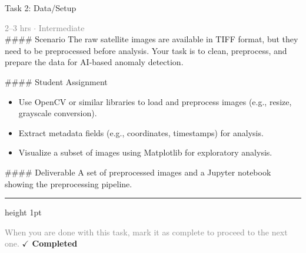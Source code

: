 \documentclass[10pt,a4paper]{article}
\begin{document}
\begin{taskbox}{Task 2: Data/Setup}

    {\small \textcolor{gray}{2--3 hrs $\cdot$ Intermediate}}\\[12pt]

    \#\#\#\# Scenario  
The raw satellite images are available in TIFF format, but they need to be preprocessed before analysis. Your task is to clean, preprocess, and prepare the data for AI-based anomaly detection.  

\#\#\#\# Student Assignment  
\begin{itemize}
    \item Use OpenCV or similar libraries to load and preprocess images (e.g., resize, grayscale conversion).  
    \item Extract metadata fields (e.g., coordinates, timestamps) for analysis.  
    \item Visualize a subset of images using Matplotlib for exploratory analysis.  
\end{itemize}

\#\#\#\# Deliverable  
A set of preprocessed images and a Jupyter notebook showing the preprocessing pipeline.\par

    \vspace{16pt}

    \textcolor{cardBorder}{\hrule height 1pt}\vspace{8pt}

    \small \textcolor{gray}{When you are done with this task, mark it as complete to proceed to the next one.} \hfill \textbf{\textcolor{brandDark}{$\checkmark$ Completed}}

\end{taskbox}
\end{document}
